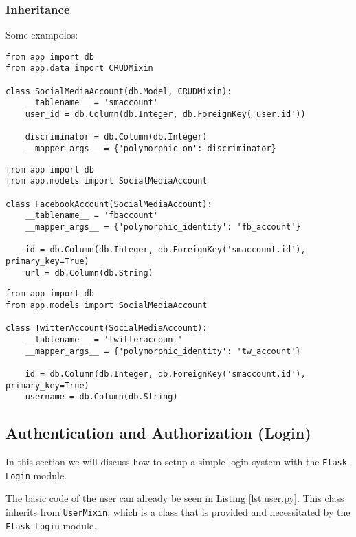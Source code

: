 \documentclass[../main/main.tex]{subfiles}
\begin{document}
\subsubsection{Inheritance}
\label{sec:inheritance}

Some exampolos: 

\begin{lstlisting}
from app import db
from app.data import CRUDMixin

class SocialMediaAccount(db.Model, CRUDMixin):
    __tablename__ = 'smaccount'
    user_id = db.Column(db.Integer, db.ForeignKey('user.id'))

    discriminator = db.Column(db.Integer)
    __mapper_args__ = {'polymorphic_on': discriminator}  
\end{lstlisting}

\begin{lstlisting}
from app import db
from app.models import SocialMediaAccount

class FacebookAccount(SocialMediaAccount):
    __tablename__ = 'fbaccount'
    __mapper_args__ = {'polymorphic_identity': 'fb_account'}

    id = db.Column(db.Integer, db.ForeignKey('smaccount.id'), primary_key=True)
    url = db.Column(db.String)
\end{lstlisting}


\begin{lstlisting}
from app import db
from app.models import SocialMediaAccount

class TwitterAccount(SocialMediaAccount):
    __tablename__ = 'twitteraccount'
    __mapper_args__ = {'polymorphic_identity': 'tw_account'}

    id = db.Column(db.Integer, db.ForeignKey('smaccount.id'), primary_key=True)
    username = db.Column(db.String)  
\end{lstlisting}

\subsection{Authentication and Authorization (Login)}
\label{sec:auth}

In this section we will discuss how to setup a simple login system
with the \lstinline|Flask-Login| module. 

The basic code of the user can already be seen in Listing
\ref{lst:user.py}. This class inherits from \lstinline|UserMixin|,
which is a class that is provided and necessitated by the
\lstinline|Flask-Login| module. 
\end{document}
